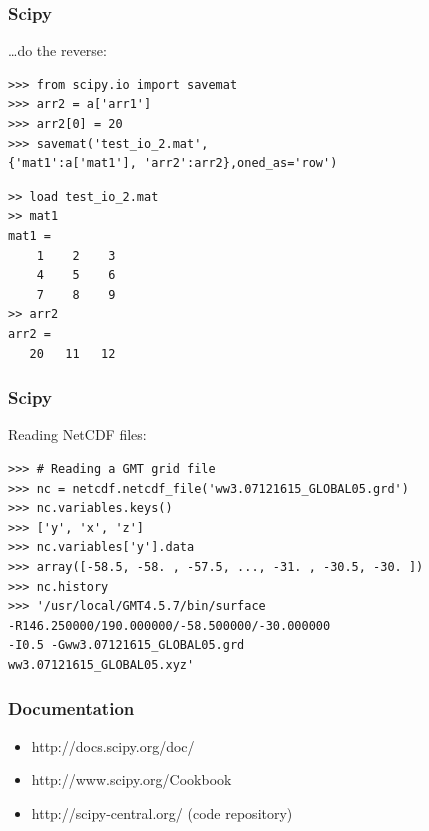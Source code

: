 \begin{frame}[fragile]
\frametitle{Scipy}
\ldots do the reverse:
\begin{myColorBox}{1.0}{}
\begin{verbatim}
>>> from scipy.io import savemat
>>> arr2 = a['arr1']
>>> arr2[0] = 20
>>> savemat('test_io_2.mat',
{'mat1':a['mat1'], 'arr2':arr2},oned_as='row')
\end{verbatim}
\end{myColorBox}
\pause
\begin{myColorBox}{1.0}{}
\begin{verbatim}
>> load test_io_2.mat
>> mat1
mat1 =
    1    2    3
    4    5    6
    7    8    9
>> arr2
arr2 =
   20   11   12
\end{verbatim}
\end{myColorBox}
\end{frame}

\begin{frame}[fragile]
\frametitle{Scipy}
Reading NetCDF files:
\begin{myColorBox}{1.0}{}
\begin{verbatim}
>>> # Reading a GMT grid file
>>> nc = netcdf.netcdf_file('ww3.07121615_GLOBAL05.grd')
>>> nc.variables.keys()
>>> ['y', 'x', 'z']
>>> nc.variables['y'].data
>>> array([-58.5, -58. , -57.5, ..., -31. , -30.5, -30. ])
>>> nc.history
>>> '/usr/local/GMT4.5.7/bin/surface 
-R146.250000/190.000000/-58.500000/-30.000000 
-I0.5 -Gww3.07121615_GLOBAL05.grd 
ww3.07121615_GLOBAL05.xyz'
\end{verbatim}
\end{myColorBox}
\end{frame}

\begin{frame}[fragile]
\frametitle{Documentation}
\begin{itemize}
  \item http://docs.scipy.org/doc/
  \item http://www.scipy.org/Cookbook
  \item http://scipy-central.org/ (code repository)   
\end{itemize}
\end{frame}
